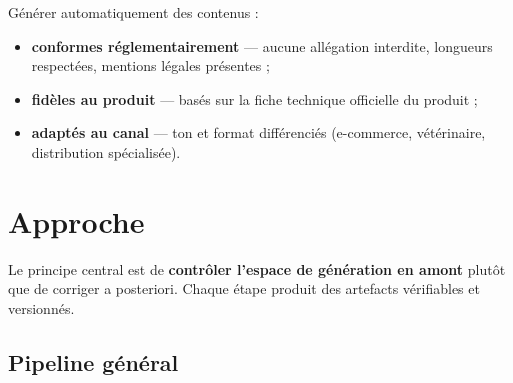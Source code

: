 \documentclass[11pt,a4paper]{article}
\begin{document}
Générer automatiquement des contenus :

\begin{itemize}[leftmargin=1.5em]
  \item \textbf{conformes réglementairement} — aucune allégation interdite, longueurs
        respectées, mentions légales présentes ;
  \item \textbf{fidèles au produit} — basés sur la fiche technique officielle du produit ;
  \item \textbf{adaptés au canal} — ton et format différenciés (e-commerce, vétérinaire,
        distribution spécialisée).
\end{itemize}

\section{Approche}

Le principe central est de \textbf{contrôler l'espace de génération en amont} plutôt que de
corriger a posteriori. Chaque étape produit des artefacts vérifiables et versionnés.

\subsection{Pipeline général}
\end{document}
